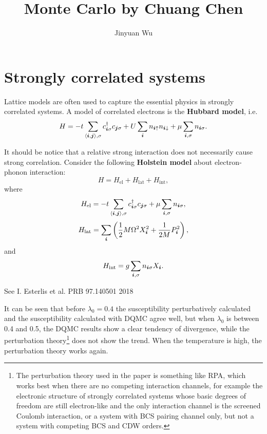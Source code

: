 \documentclass[hyperref, a4paper]{article}
\title{Monte Carlo by Chuang Chen}
\author{Jinyuan Wu}
\newcommand*{\pair}[1]{\langle #1 \rangle}
\newcommand*{\concept}[1]{{\textbf{#1}}}
\begin{document}
\maketitle

\section{Strongly correlated systems}

Lattice models are often used to capture the essential physics in strongly correlated systems.
A model of correlated electrons is the \concept{Hubbard model}, i.e.
\begin{equation}
    H = - t \sum_{\pair{\vb*{i}, \vb*{j}}, \sigma} c^\dagger_{\vb*{i} \sigma} c_{\vb*{j} \sigma} + U \sum_{\vb*{i}} n_{\vb*{i} \uparrow} n_{\vb*{i} \downarrow} + \mu \sum_{\vb*{i}, \sigma} n_{\vb*{i} \sigma}.
\end{equation}

It should be notice that a relative strong interaction does not necessarily cause strong correlation.
Consider the following \concept{Holstein model} about electron-phonon interaction:
\begin{equation}
    H = H_\text{el} + H_\text{lat} + H_\text{int},
\end{equation}
where 
\begin{equation}
    H_\text{el} = - t \sum_{\pair{\vb*{i}, \vb*{j}}, \sigma} c^\dagger_{\vb*{i} \sigma} c_{\vb*{j} \sigma} + \mu \sum_{\vb*{i}, \sigma} n_{\vb*{i} \sigma},
\end{equation}
\begin{equation}
    H_\text{lat} = \sum_{\vb*{i}} \left( \frac{1}{2} M \Omega^2 {X}_{\vb*{i}}^2 + \frac{1}{2M} {P}_{\vb*{i}}^2 \right),
\end{equation}
and 
\begin{equation}
    H_\text{int} = g \sum_{\vb*{i}, \sigma} n_{\vb*{i} \sigma} {X}_{\vb*{i}}.
\end{equation}

See I. Esterlis et al. PRB 97.140501 2018

It can be seen that before $\lambda_0 = 0.4$ the susceptibility perturbatively calculated and the susceptibility calculated with DQMC agree well, but when $\lambda_0$ is between 0.4 and 0.5, the DQMC results show a clear tendency of divergence, while the perturbation theory\footnote{The perturbation theory used in the paper is something like RPA, which works best when there are no competing interaction channels, for example the electronic structure of strongly correlated systems whose basic degrees of freedom are still electron-like and the only interaction channel is the screened Coulomb interaction, or a system with BCS pairing channel only, but not a system with competing BCS and CDW orders.} does not show the trend.
When the temperature is high, the perturbation theory works again.
\end{document}

